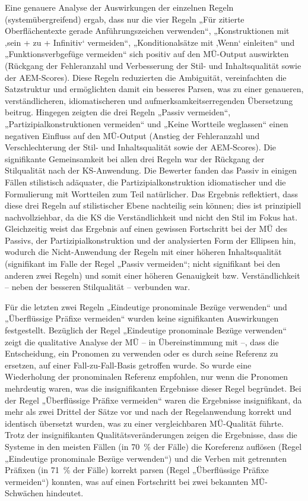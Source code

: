 Eine genauere Analyse der Auswirkungen der einzelnen Regeln (systemübergreifend) ergab, dass nur die vier Regeln „Für zitierte Oberflächentexte gerade Anführungszeichen verwenden“, „Konstruktionen mit ‚sein + zu + Infinitiv‘ vermeiden“, „Konditionalsätze mit ‚Wenn‘ einleiten“ und „Funktionsverbgefüge vermeiden“ sich positiv auf den MÜ-Output auswirkten (Rückgang der Fehleranzahl und Verbesserung der Stil- und Inhaltsqualität sowie der AEM-Scores). Diese Regeln reduzierten die Ambiguität, vereinfachten die Satzstruktur und ermöglichten damit ein besseres Parsen, was zu einer genaueren, verständlicheren, idiomatischeren und aufmerksamkeitserregenden Übersetzung beitrug. Hingegen zeigten die drei Regeln „Passiv vermeiden“, „Partizipialkonstruktionen vermeiden“ und „Keine Wortteile weglassen“ einen negativen Einfluss auf den MÜ-Output (Anstieg der Fehleranzahl und Verschlechterung der Stil- und Inhaltsqualität sowie der AEM-Scores). Die signifikante Gemeinsamkeit bei allen drei Regeln war der Rückgang der Stilqualität nach der KS-Anwendung. Die Bewerter fanden das Passiv in einigen Fällen stilistisch adäquater, die Partizipialkonstruktion idiomatischer und die Formulierung mit Wortteilen zum Teil natürlicher. Das Ergebnis reflektiert, dass diese drei Regeln auf stilistischer Ebene nachteilig sein können; dies ist prinzipiell nachvollziehbar, da die KS die Verständlichkeit und nicht den Stil im Fokus hat. Gleichzeitig weist das Ergebnis auf einen gewissen Fortschritt bei der MÜ des Passivs, der Partizipialkonstruktion und der analysierten Form der Ellipsen hin, wodurch die Nicht-Anwendung der Regeln mit einer höheren Inhaltsqualität (signifikant im Falle der Regel „Passiv vermeiden“; nicht signifikant bei den anderen zwei Regeln) und somit einer höheren Genauigkeit bzw. Verständlichkeit -- neben der besseren Stilqualität -- verbunden war.

Für die letzten zwei Regeln „Eindeutige pronominale Bezüge verwenden“ und „Überflüssige Präfixe vermeiden“ wurden keine signifikanten Auswirkungen festgestellt. Bezüglich der Regel „Eindeutige pronominale Bezüge verwenden“ zeigt die qualitative Analyse der MÜ -- in Übereinstimmung mit \citet{BernthGdaniec2001} --, dass die Entscheidung, ein Pronomen zu verwenden oder es durch seine Referenz zu ersetzen, auf einer Fall-zu-Fall-Basis getroffen wurde. So wurde eine Wiederholung der pronominalen Referenz empfohlen, nur wenn die Pronomen mehrdeutig waren, was die insignifikanten Ergebnisse dieser Regel begründet. Bei der Regel „Überflüssige Präfixe vermeiden“ waren die Ergebnisse insignifikant, da mehr als zwei Drittel der Sätze vor und nach der Regelanwendung korrekt und identisch übersetzt wurden, was zu einer vergleichbaren MÜ-Qualität führte. Trotz der insignifikanten Qualitätsveränderungen zeigen die Ergebnisse, dass die Systeme in den meisten Fällen (in 70~\% der Fälle) die Koreferenz auflösen (Regel „Eindeutige pronominale Bezüge verwenden“) und die Verben mit getrennten Präfixen (in 71~\% der Fälle) korrekt parsen (Regel „Überflüssige Präfixe vermeiden“) konnten, was auf einen Fortschritt bei zwei bekannten MÜ-Schwächen hindeutet.

